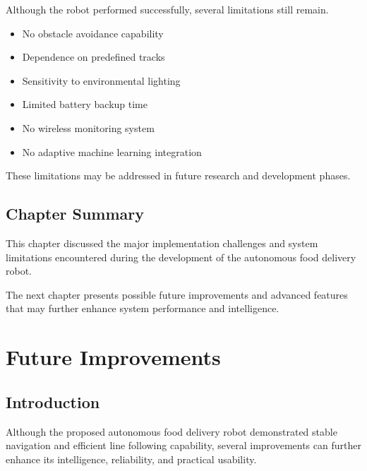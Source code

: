 \documentclass[12pt,a4paper,oneside]{report}
\begin{document}
Although the robot performed successfully, several limitations still remain.

\begin{itemize}

\item No obstacle avoidance capability

\item Dependence on predefined tracks

\item Sensitivity to environmental lighting

\item Limited battery backup time

\item No wireless monitoring system

\item No adaptive machine learning integration

\end{itemize}

These limitations may be addressed in future research and development phases.


\section{Chapter Summary}

This chapter discussed the major implementation challenges and system limitations encountered during the development of the autonomous food delivery robot.

The next chapter presents possible future improvements and advanced features that may further enhance system performance and intelligence.


\chapter{Future Improvements}

\section{Introduction}

Although the proposed autonomous food delivery robot demonstrated stable navigation and efficient line following capability, several improvements can further enhance its intelligence, reliability, and practical usability.
\end{document}

